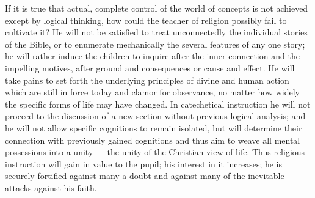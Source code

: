 If it is true that actual, complete control of the world of concepts is not achieved except by logical thinking, how
could the teacher of religion possibly fail to cultivate it? He will not be satisfied to treat unconnectedly the individual stories of the Bible, or to enumerate mechanically the several features of any one story; he will rather induce the children to inquire after the inner connection and the impelling motives, after ground and consequences or cause and effect. He will take pains to set forth the underlying principles of divine and human action which are still in force today and clamor for observance, no matter how widely the specific forms of life may have changed. In catechetical instruction he will not proceed to the discussion of a new section without previous logical analysis; and he will not allow specific cognitions to remain isolated, but will determine their connection with previously gained cognitions and thus aim to weave all mental possessions into a unity — the unity of the Christian view of life. Thus religious instruction will gain in value to the pupil; his interest in it increases; he is securely fortified against many a doubt and against many of the inevitable attacks against his faith.

